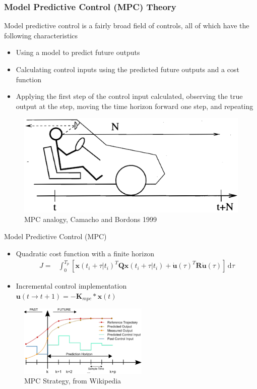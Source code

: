 \documentclass[aspectratio=169]{beamer}
\begin{document}
\begin{frame}[t]
    \frametitle{Model Predictive Control (MPC) Theory}
    Model predictive control is a fairly broad field of controls, all of which have the following characteristics
    \begin{itemize}
        \item Using a model to predict future outputs
        \item Calculating control inputs using the predicted future outputs and a cost function
        \item Applying the first step of the control input calculated, observing the true output at
            the step, moving the time horizon forward one step, and repeating
    \end{itemize}
    \begin{figure}
        \centering
        \includegraphics[scale=0.4]{MPC_analogy.png}
        \caption{MPC analogy, Camacho and Bordons 1999}
        \label{fig:my_label}
    \end{figure}
\end{frame}

\begin{frame}{Model Predictive Control (MPC)}
    \begin{itemize}
        \item Quadratic cost function with a finite horizon
        \begin{eqnarray*}
        J = & \int_0^{T_{p}} \! [\mathbf{x}(t_{i}+\tau|t_{i})^T\mathbf{Q}\mathbf{x}(t_{i}+\tau|t_{i}) +\Dot{\mathbf{u}}(\tau)^T\mathbf{R}\Dot{\mathbf{u}}(\tau)] \, \mathrm{d}\tau 
        \end{eqnarray*}
        \item Incremental control implementation\\
            $ \mathbf{u}(t\rightarrow{t+1}) = -\mathbf{K}_{mpc}*\mathbf{x}(t)$
    \end{itemize}
    \begin{figure}
        \centering
        \includegraphics[width=0.55\textwidth]{MPC_scheme_basic.pdf}
        \caption{MPC Strategy, from Wikipedia}
    \end{figure}
\end{frame}
\end{document}
